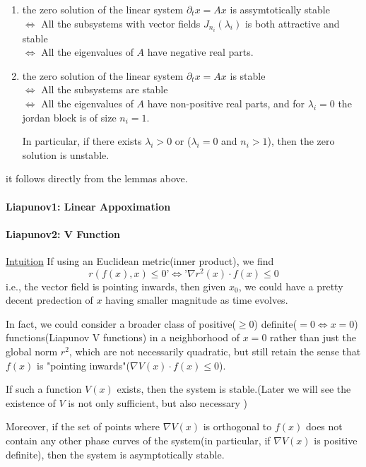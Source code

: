 \documentclass{tufte-handout}
\begin{document}
\begin{theorem} 
	\begin{enumerate}
		\item 
	the zero solution of the linear system $\partial_t x = Ax$ is assymtotically stable  \\ $\iff$ All the subsystems with vector fields $J_{n_i}(\lambda_i)$ is both attractive and stable \\ $\iff$ All the eigenvalues of $A$ have negative real parts.
\item
	the zero solution of the linear system $\partial_t x = Ax$ is stable \\ $\iff$ All the subsystems are stable \\ $\iff$ All the eigenvalues of $A$ have non-positive real parts, and for $\lambda_i=0$ the jordan block is of size $n_i=1$.

	In particular, if there exists $\lambda_i>0$ or ($\lambda_i=0$ and $n_i>1$), then the zero solution is unstable.
\end{enumerate}
\end{theorem}
\begin{formalproof} it follows directly from the lemmas above. \end{formalproof}
\paragraph{Liapunov1: Linear Appoximation}
\cite{arnold1992ordinary}
\paragraph{Liapunov2: V Function}
\underline{Intuition}
If using an Euclidean metric(inner product), we find \[ r(f(x),x)\leq 0  \text{'} \iff \text{'}  \nabla r^2(x) \cdot f(x) \leq 0 \]
i.e., the vector field is pointing inwards, then given $x_0$, we could have a pretty decent predection of $x$ having smaller magnitude as time evolves.


In fact, we could consider a broader class of positive($\geq0$) definite($=0 \iff x=0$) functions(Liapunov V functions) in a neighborhood of $x=0$ rather than just the global norm $r^2$, which are not necessarily quadratic, but still retain the sense that $f(x)$ is "pointing inwards"($\nabla V(x) \cdot f(x) \leq 0$).
\begin{theorem} 
	If such a function $V(x)$ exists, then the system is stable.(Later we will see the existence of $V$ is not only sufficient, but also necessary )

	Moreover, if the set of points where $\nabla V(x)$ is orthogonal to $f(x)$ does not contain any other phase curves of the system(in particular, if $\nabla V(x) $ is positive definite), then the system is asymptotically stable.

\end{theorem} 
\end{document}
